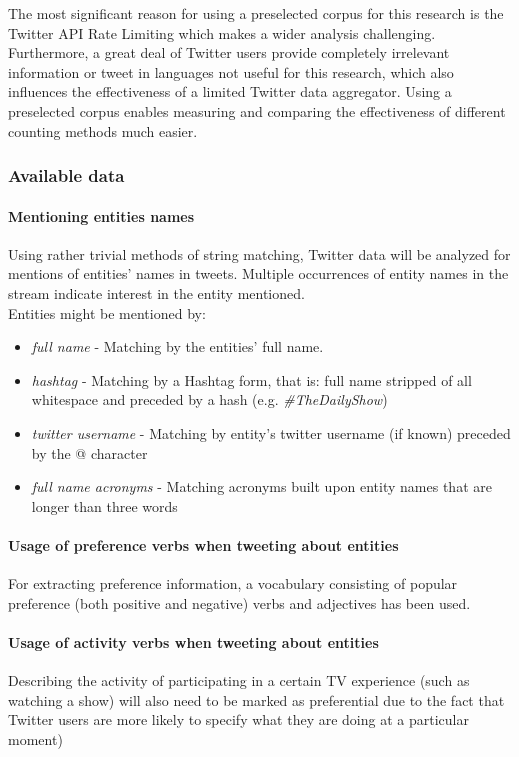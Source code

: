 The most significant reason for using a preselected corpus for this research is
the Twitter API Rate Limiting which makes a wider analysis challenging.
Furthermore, a great deal of Twitter users provide completely irrelevant
information or tweet in languages not useful for this research, which also
influences the effectiveness of a limited Twitter data aggregator. Using a preselected corpus enables measuring and comparing the effectiveness of different counting methods much easier.

\subsubsection{Available data}
\paragraph{Mentioning entities names}
Using rather trivial methods of string matching, Twitter data will be analyzed for
mentions of entities' names in tweets. Multiple occurrences of entity names in the
stream indicate interest in the entity mentioned. \\
Entities might be mentioned by:
\begin{itemize}
  \item \textit{full name} - Matching by the entities' full name.
  \item \textit{hashtag} - Matching by a Hashtag form, that is: full name stripped of all whitespace and preceded by a hash (e.g. \textit{\#TheDailyShow})
  \item \textit{twitter username} - Matching by entity's twitter username (if known) preceded by the @ character
  \item \textit{full name acronyms} - Matching acronyms built upon entity names that are longer than three words
\end{itemize}
\paragraph{Usage of preference verbs when tweeting about entities}
For extracting preference information, a vocabulary consisting of
popular preference (both positive and negative) verbs and adjectives has been used.
\paragraph{Usage of activity verbs when tweeting about entities}
Describing the activity of participating in a certain TV experience (such
as watching a show) will also need to be marked as preferential due to the
fact that Twitter users are more likely to specify what they are doing at a
particular moment)

